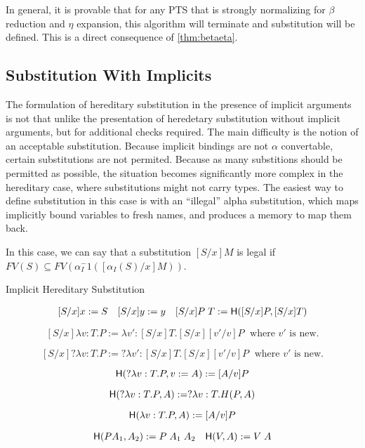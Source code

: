 In general, it is provable that for any PTS that is strongly normalizing for $\beta$ reduction and 
$\eta$ expansion, this algorithm will terminate and substitution will be defined.  
This is a direct consequence of \ref{thm:betaeta}.


\subsection{Substitution With Implicits}

The formulation of hereditary substitution in the presence of 
implicit arguments is not that unlike the presentation of
heredetary substitution without implicit arguments, 
but for additional checks required.
The main difficulty is the notion of an acceptable substitution. 
Because implicit bindings are not $\alpha$ convertable, 
certain substitutions are not permited.  
Because as many substitions should be permitted as possible, 
the situation becomes significantly more complex in the 
hereditary case, where substitutions might not carry types.  
The easiest way to define substitution in this case is with an ``illegal'' alpha substitution, 
which maps implicitly bound variables to fresh names, 
and produces a memory to map them back.

In this case, we can say that a substitution $[S/x] M$ is legal if 
$FV(S) \subseteq FV(\alpha_I^-1( [\alpha_I(S)/x] M) )$.

\begin{definition}
Implicit Hereditary Substitution

\[ \begin{array}[3]{llr}
[ S / x ] x := S
&
[S / x] y := y
&
[S / x] P\;T := \m{H}([S/x] P, [S/x]T)
\end{array} \]

\[
[S / x] \lambda v : T . P := \lambda v' : [S/x]T . [S/x][v'/v]P
\;
\text{ where $v'$ is new.}
\]

\[
[S / x] ?\lambda v : T . P := ?\lambda v' : [S/x]T . [S/x][v'/v]P
\;
\text{ where $v'$ is new.}
\]

\[ 
\mathsf{H}(?\lambda v : T . P , {v := A} ) := [A/v] P
\]

\[ 
\mathsf{H}(?\lambda v : T . P , A) := ?\lambda v : T . H(P,A)
\]

\[ 
\mathsf{H}(\lambda v : T . P , A) := [A/v] P
\]

\[ \begin{array}[2]{lr}
\m{H}(P A_1 , A_2) := P\;A_1\;A_2
&
\m{H}(V , A) := V\; A
\end{array} \]

\label{def:hered}
\end{definition}